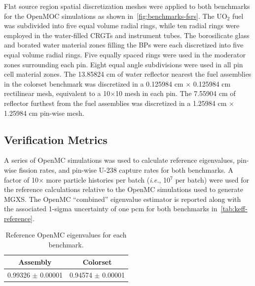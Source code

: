 
Flat source region spatial discretization meshes were applied to both benchmarks for the OpenMOC simulations as shown in~\autoref{fig:benchmarks-fsrs}. The UO$_2$ fuel was subdivided into five equal volume radial rings, while ten radial rings were employed in the water-filled CRGTs and instrument tubes. The borosilicate glass and borated water material zones filling the BPs were each discretized into five equal volume radial rings. Five equally spaced rings were used in the moderator zones surrounding each pin. Eight equal angle subdivisions were used in all pin cell material zones. The 13.85824 cm of water reflector nearest the fuel assemblies in the colorset benchmark was discretized in a 0.125984 cm $\times$ 0.125984 cm rectilinear mesh, equivalent to a 10$\times$10 mesh in each pin. The 7.55904 cm of reflector furthest from the fuel assemblies was discretized in a 1.25984 cm $\times$ 1.25984 cm pin-wise mesh.

\subsection{Verification Metrics}
\label{subsec:metrics}

A series of OpenMC simulations was used to calculate reference eigenvalues, pin-wise fission rates, and pin-wise U-238 capture rates for both benchmarks. A factor of 10$\times$ more particle histories per batch (\textit{i.e.}, 10$^7$ per batch) were used for the reference calculations relative to the OpenMC simulations used to generate MGXS. The OpenMC ``combined'' eigenvalue estimator is reported along with the associated 1-sigma uncertainty of one pcm for both benchmarks in~\autoref{tab:keff-reference}.


\begin{table}[h!]
  \centering
  \caption{Reference OpenMC eigenvalues for each benchmark.}
  \label{tab:keff-reference} 
  \begin{tabular}{c c}
  \toprule
  {\bf Assembly} &
  {\bf Colorset} \\
  \midrule
  0.99326 $\pm$ 0.00001 & 0.94574 $\pm$ 0.00001 \\
  \bottomrule
\end{tabular}
\end{table}

